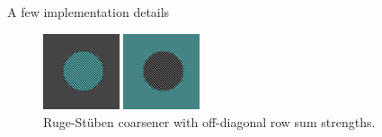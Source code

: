 \documentclass[8pt]{beamer}
\begin{document}
\begin{frame}{A few implementation details}
   \begin{figure}[ht]
      \centering
      \includegraphics[width=0.2\textwidth]{checker_disk_60_seg_blend_RSAMG_row_sum_0000.png} \hspace{0.45cm}
      \includegraphics[width=0.2\textwidth]{checker_disk_60_seg_blend_RSAMG_row_sum_0001.png} 
      ~\\Ruge-St\"uben coarsener with off-diagonal row sum strengths.
   \end{figure}

\end{frame}
\end{document}
